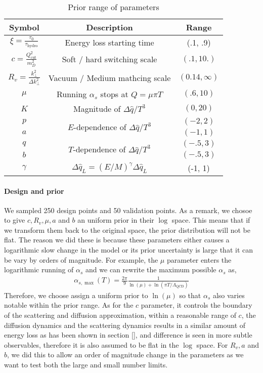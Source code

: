 \begin{table}
\centering
\caption{Prior range of parameters}\label{table:new:prior}
\begin{tabular}{ccc}
\hline
Symbol & Description & Range \\
\hline
$\xi = \frac{\tau_0}{\tau_{\textrm{hydro}}}$ & Energy loss starting time & (.1, .9) \\
$c = \frac{Q_{\textrm{cut}}^2}{m_D^2}$ & Soft / hard switching scale & $(.1, 10.)$ \\
$R_v = \frac{k_\perp^2}{\Delta k_\perp^2}$ & Vacuum / Medium mathcing scale & $(0.14, \infty)$\\
$\mu$ & Running $\alpha_s$ stops at $Q = \mu\pi T$ & $(.6, 10)$ \\
$K$ & Magnitude of $\Delta \hat{q}/T^3$ & $(0, 20)$\\ 
$p$ & \multirow{2}{*}{$E$-dependence of $\Delta \hat{q}/T^3$} & $(-2, 2)$\\ 
$a$ &  & $(-1, 1)$\\ 
$q$ & \multirow{2}{*}{$T$-dependence of $\Delta \hat{q}/T^3$}  & $(-.5, 3)$\\ 
$b$ &   & $(-.5, 3)$\\ 
$\gamma$ & $\Delta \hat{q}_L = (E/M)^\gamma\Delta \hat{q}_L$  & (-1, 1)\\ 
\hline
\end{tabular}
\end{table}

\paragraph{Design and prior} We sampled 250 design points and 50 validation points. 
As a remark, we chosoe to give $c, R_v, \mu, a$ and $b$ an uniform prior in their $\log$ space.
This means that if we transform them back to the original space, the prior distribution will not be flat.
The reason we did these is because these parameters either causes a logarithmic slow change in the model or its prior uncertainty is large that it can be vary by orders of magnitude.
For example, the $\mu$ parameter enters the logarithmic running of $\alpha_s$ and we can rewrite the maximum possible $\alpha_s$ as,
\begin{eqnarray}
\alpha_{s,\max}(T) = \frac{2\pi}{9}\frac{1}{\ln(\mu) + \ln(\pi T/\Lambda_{\textrm{QCD}})}
\end{eqnarray}
Therefore, we choose assign a uniform prior to $\ln(\mu)$ so that $\alpha_s$ also varies notable within the prior range.
As for the $c$ parameter, it controls the boundary of the scattering and diffusion approximation, within a reasonable range of $c$, the diffusion dynamics and the scattering dynamics results in a similar amount of energy loss as has been shown in section [], and difference is seen in more subtle observables, therefore it is also assumed to be flat in the $\log$ space.
For $R_v, a$ and $b$, we did this to allow an order of magnitude change in the parameters as we want to test both the large and small number limits.


